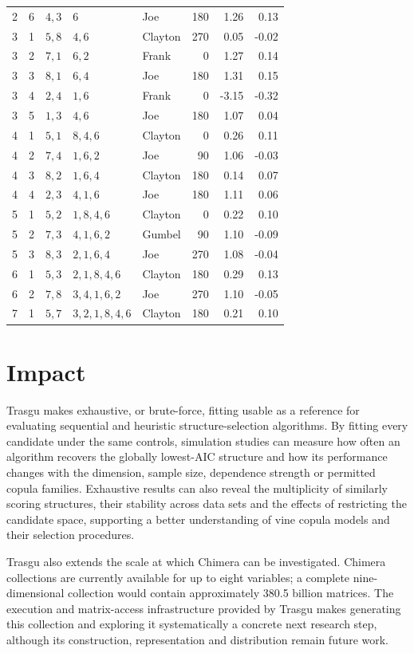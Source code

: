 \documentclass[preprint,12pt, a4paper]{elsarticle}
\begin{document}
\begin{longtable}{@{}cc>{\centering\arraybackslash}p{1.25cm}>{\centering\arraybackslash}p{2.45cm}lrrr@{}}
2 & 6 & $4,3$ & $6$ & Joe & 180 & 1.26 & 0.13 \\
3 & 1 & $5,8$ & $4,6$ & Clayton & 270 & 0.05 & -0.02 \\
3 & 2 & $7,1$ & $6,2$ & Frank & 0 & 1.27 & 0.14 \\
3 & 3 & $8,1$ & $6,4$ & Joe & 180 & 1.31 & 0.15 \\
3 & 4 & $2,4$ & $1,6$ & Frank & 0 & -3.15 & -0.32 \\
3 & 5 & $1,3$ & $4,6$ & Joe & 180 & 1.07 & 0.04 \\
4 & 1 & $5,1$ & $8,4,6$ & Clayton & 0 & 0.26 & 0.11 \\
4 & 2 & $7,4$ & $1,6,2$ & Joe & 90 & 1.06 & -0.03 \\
4 & 3 & $8,2$ & $1,6,4$ & Clayton & 180 & 0.14 & 0.07 \\
4 & 4 & $2,3$ & $4,1,6$ & Joe & 180 & 1.11 & 0.06 \\
5 & 1 & $5,2$ & $1,8,4,6$ & Clayton & 0 & 0.22 & 0.10 \\
5 & 2 & $7,3$ & $4,1,6,2$ & Gumbel & 90 & 1.10 & -0.09 \\
5 & 3 & $8,3$ & $2,1,6,4$ & Joe & 270 & 1.08 & -0.04 \\
6 & 1 & $5,3$ & $2,1,8,4,6$ & Clayton & 180 & 0.29 & 0.13 \\
6 & 2 & $7,8$ & $3,4,1,6,2$ & Joe & 270 & 1.10 & -0.05 \\
7 & 1 & $5,7$ & $3,2,1,8,4,6$ & Clayton & 180 & 0.21 & 0.10 \\
\end{longtable}
\endgroup

\section{Impact}

Trasgu makes exhaustive, or brute-force, fitting usable as a reference for
evaluating sequential and heuristic structure-selection algorithms. By fitting
every candidate under the same controls, simulation studies can measure how
often an algorithm recovers the globally lowest-AIC structure and how its
performance changes with the dimension, sample size, dependence strength or
permitted copula families. Exhaustive results can also reveal the multiplicity
of similarly scoring structures, their stability across data sets and the
effects of restricting the candidate space, supporting a better understanding
of vine copula models and their selection procedures.

Trasgu also extends the scale at which Chimera can be investigated. Chimera
collections are currently available for up to eight variables; a complete
nine-dimensional collection would contain approximately 380.5 billion
matrices. The execution and matrix-access infrastructure provided by Trasgu
makes generating this collection and exploring it systematically a concrete
next research step, although its construction, representation and distribution
remain future work.
\end{document}
